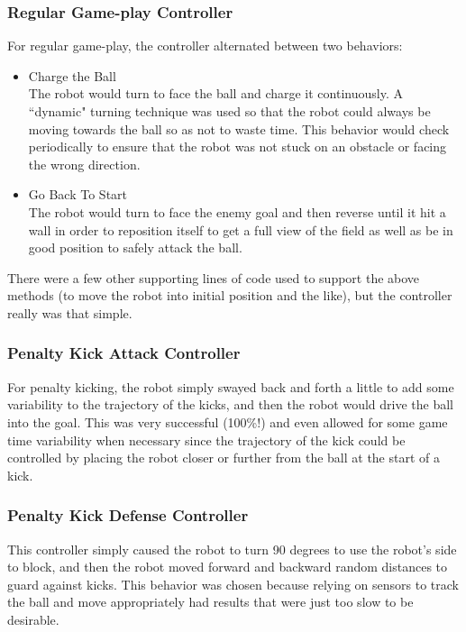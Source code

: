 \documentclass{article}
\begin{document}
\subsubsection{Regular Game-play Controller}
For regular game-play, the controller alternated between two behaviors: 

\begin{itemize}
  \item Charge the Ball \\
  The robot would turn to face the ball and charge it continuously. A ``dynamic" turning technique was used so that the robot could always be moving towards the ball so as not to waste time. This behavior would check periodically to ensure that the robot was not stuck on an obstacle or facing the wrong direction.\\

  \item Go Back To Start\\
  The robot would turn to face the enemy goal and then reverse until it hit a wall in order to reposition itself to get a full view of the field as well as be in good position to safely attack the ball.\\
\end{itemize}

There were a few other supporting lines of code used to support the above methods (to move the robot into initial position and the like), but the controller really was that simple.

\subsubsection{Penalty Kick Attack Controller}
For penalty kicking, the robot simply swayed back and forth a little to add some variability to the trajectory of the kicks, and then the robot would drive the ball into the goal. This was very successful (100\%!) and even allowed for some game time variability when necessary since the trajectory of the kick could be controlled by placing the robot closer or further from the ball at the start of a kick.

\subsubsection{Penalty Kick Defense Controller}
This controller simply caused the robot to turn 90 degrees to use the robot's side to block, and then the robot moved forward and backward random distances to guard against kicks. This behavior was chosen because relying on sensors to track the ball and move appropriately had results that were just too slow to be desirable.
\end{document}
